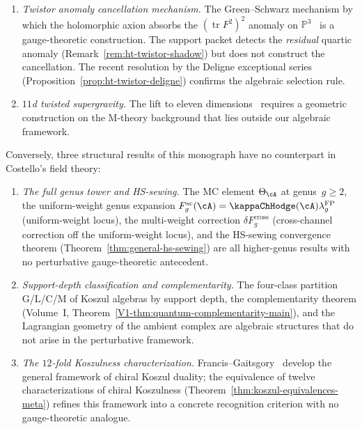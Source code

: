 \begin{remark}
\begin{enumerate}[label=\textup{(\alph*)}]
\item
 \emph{Twistor anomaly cancellation mechanism.}
 The Green--Schwarz mechanism by which the holomorphic axion
 absorbs the $(\operatorname{tr} F^2)^2$ anomaly on
 $\mathbb{P}^3$~\cite{Costello2111} is a gauge-theoretic
 construction. The support packet detects the
 \emph{residual} quartic anomaly
 (Remark~\ref{rem:ht-twistor-shadow}) but does not
 construct the cancellation. The recent resolution by the
 Deligne exceptional series
 (Proposition~\ref{prop:ht-twistor-deligne}) confirms the
 algebraic selection rule.

\item
 \emph{$11$d twisted supergravity.}
 The lift to eleven dimensions~\cite{RSW23}
 requires a geometric construction on the M-theory background
 that lies outside our algebraic framework.
\end{enumerate}
Conversely, three structural results of this monograph have
no counterpart in Costello's field theory:
\begin{enumerate}[label=\textup{(\alph*)}]
\item
 \emph{The full genus tower and HS-sewing.}
 The MC element $\Theta_\cA$ at genus~$g \geq 2$, the
 uniform-weight genus expansion
 $F_g^{\mathrm{sc}}(\cA)=\kappaChHodge(\cA)\lambda_g^{\mathrm{FP}}$
 \textup{(uniform-weight locus)},
 the multi-weight correction
 $\delta F_g^{\mathrm{cross}}$
 \textup{(cross-channel correction off the uniform-weight locus)},
 and the HS-sewing convergence
 theorem (Theorem~\ref{thm:general-hs-sewing}) are all
 higher-genus results with no perturbative gauge-theoretic
 antecedent.

\item
 \emph{Support-depth classification and complementarity.}
 The four-class partition G/L/C/M of Koszul algebras by support
 depth, the complementarity theorem
 (Volume~I, Theorem~\ref{V1-thm:quantum-complementarity-main}), and the
 Lagrangian geometry of the ambient complex are algebraic
 structures that do not arise in the perturbative framework.

\item
 \emph{The $12$-fold Koszulness characterization.}
 Francis--Gaitsgory~\cite{FG12} develop the general
 framework of chiral Koszul duality; the equivalence of twelve
 characterizations of chiral Koszulness
 (Theorem~\ref{thm:koszul-equivalences-meta})
 refines this framework into a concrete recognition criterion
 with no gauge-theoretic analogue.
\end{enumerate}
\end{remark}

